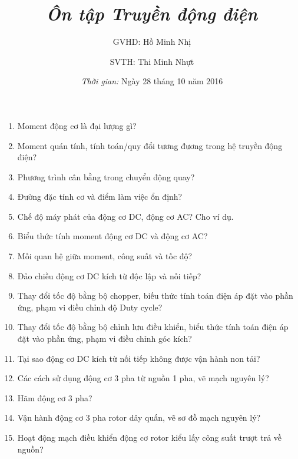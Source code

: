 \documentclass[12pt,a4paper]{article}
\begin{document}
\title{\textbf{\textit{Ôn tập Truyền động điện}}}
\author{GVHD: Hồ Minh Nhị \and SVTH: Thi Minh Nhựt}
\date{\textit{Thời gian:} Ngày 28 tháng 10 năm 2016}
\maketitle
\begin{enumerate}
	\item Moment động cơ là đại lượng gì?
	
	\item Moment quán tính, tính toán/quy đổi tương đương trong hệ truyền động điện?
	
	\item Phương trình cân bằng trong chuyển động quay?
	
	\item Đường đặc tính cơ và điểm làm việc ổn định?
	
	\item Chế độ máy phát của động cơ DC, động cơ AC? Cho ví dụ.
	
	\item Biểu thức tính moment động cơ DC và động cơ AC?
	
	\item Mối quan hệ giữa moment, công suất và tốc độ?
	
	\item Đảo chiều động cơ DC kích từ độc lập và nối tiếp?
	
	\item Thay đổi tốc độ bằng bộ chopper, biếu thức tính toán điện áp đặt vào phần ứng, phạm vi điều chỉnh độ Duty cycle?
	
	\item Thay đổi tốc độ bằng bộ chỉnh lưu điều khiển, biểu thức tính toán điện áp đặt vào phần ứng, phạm vi điều chỉnh góc kích?
	
	\item Tại sao động cơ DC kích từ nối tiếp không được vận hành non tải?
	
	\item Các cách sử dụng động cơ 3 pha từ nguồn 1 pha, vẽ mạch nguyên lý?
	
	\item Hãm động cơ 3 pha?
	
	\item Vận hành động cơ 3 pha rotor dây quấn, vẽ sơ đồ mạch nguyên lý?
	
	\item Hoạt động mạch điều khiển động cơ rotor kiểu lấy công suất trượt trả về nguồn?


\end{enumerate}
\end{document}
